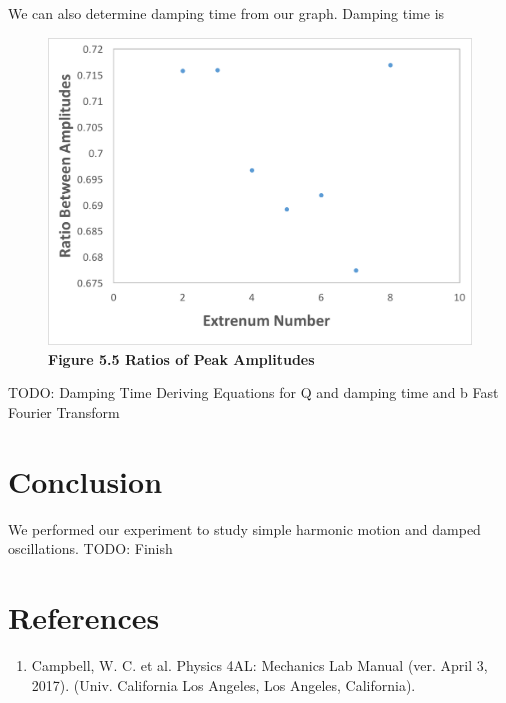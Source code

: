 \documentclass[11pt]{report}
\begin{document}
We can also determine damping time from our graph.  Damping time is 

\begin{figure}
    \includegraphics[width=\linewidth]{Extrenum.png}
    \captionsetup{labelformat=empty}
    \caption{\textbf{Figure 5.5 Ratios of Peak Amplitudes}}
\end{figure}

TODO: Damping Time
Deriving Equations for Q and damping time and b
Fast Fourier Transform

\section*{Conclusion}
We performed our experiment to study simple harmonic motion and damped
oscillations.  
TODO: Finish


\newpage
\section*{References}
\begin{enumerate}
    \item Campbell, W. C. et al. Physics 4AL: Mechanics Lab Manual (ver. April
        3, 2017). (Univ. California Los Angeles, Los Angeles, California).
\end{enumerate}
\end{document}
